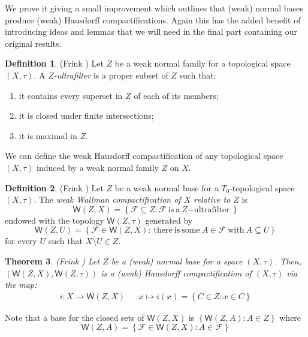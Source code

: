\documentclass{article}
\newcommand{\wall}[2]{\mathsf{W}(#1,#2)}
\theoremstyle{plain}
\newtheorem{theorem}{Theorem}[subsection]
\theoremstyle{definition}
\newtheorem{definition}[theorem]{Definition}
\theoremstyle{remark}
\newcommand{\bp}[1]{\left\lbrace #1 \right\rbrace}
\newcommand{\0}{\mathbbm 0}
\newcommand{\1}{\mathbbm 1}
\newcommand{\2}{\mathbbm 2}
\begin{document}
We prove it giving a small improvement which outlines that (weak) normal bases produce (weak) Hausdorff compactifications. Again this has the added benefit of introducing ideas and lemmas that we will need in the final part containing our original results.



\begin{definition}(Frink \cite{frink})
\label{def:Zultrafilters}
    Let $Z$ be a weak normal family for a topological space $(X, \tau)$. A \emph{$Z$-ultrafilter} is a proper subset of $Z$ such that:
    \begin{enumerate}
        \item it contains every superset in $Z$ of each of its members; 
        \item it is closed under finite intersections; 
        \item it is maximal in $Z$.
    \end{enumerate}
\end{definition} 

We can define the weak Hausdorff compactification of any topological space $(X,\tau)$ induced by a weak normal family $Z$ on $X$. 

\begin{definition}(Frink \cite{frink})
\label{def:wallman-Frinkcompactif}
    Let $Z$ be a weak normal base for a $T_0$-topological space $(X,\tau)$. The \emph{weak Wallman compactification of $X$ relative to $Z$} is 
\[
\wall{Z}{X}=\bp{\mathcal{F} \subseteq Z: \mathcal{F}  \mathrm{ \ is\ a\ } Z\mathrm{-ultrafilter\ }} 
\] 
endowed with the topology $\wall{Z}{\tau}$ generated by 
\[ 
\wall{Z}{U}=\bp{\mathcal{F} \in \wall{Z}{X}: \mathrm{ \ there\ is\ some\ }A \in \mathcal{F}\mathrm{\ with\ }A \subseteq U}
\] 
    for every $U$ such that $X \setminus U \in Z$.
\end{definition}

\begin{theorem}(Frink \cite{frink})
\label{thm:W(Z,X)iscompactification}
    Let $Z$ be a (weak) normal base for a space $(X,\tau)$. Then, $(\wall{Z}{X},\wall{Z}{\tau})$ is a (weak) Hausdorff compactification of $(X,\tau)$ via the map:
\begin{align*}
    i : X \to \wall{Z}{X}  && x \mapsto i(x)=\bp{C  \in Z: x \in C}
\end{align*}
\end{theorem}

Note that a base for the closed sets of $\wall{Z}{X}$ is $\bp{\wall{Z}{A}: A \in Z}$ where \begin{equation*}
    \wall{Z}{A}=\bp{\mathcal{F} \in \wall{Z}{X}: A \in \mathcal{F}}
\end{equation*}  
\end{document}
